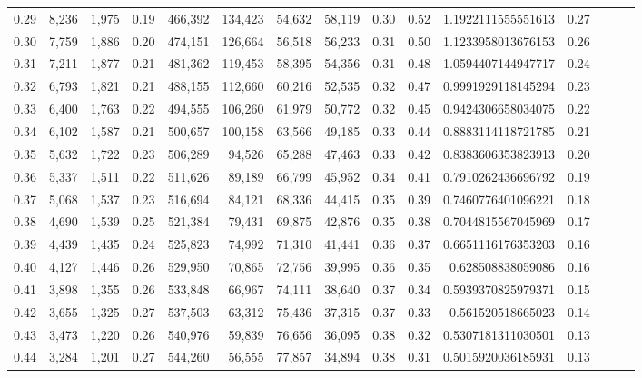 \begin{tabular}{rrrrrrrrrrrrrrr}
0.29 &   8,236 &  1,975 &  0.19 &  466,392 &  134,423 &   54,632 &   58,119 &  0.30 &  0.52 &    1.1922111555551613 &      0.27 \\
0.30 &   7,759 &  1,886 &  0.20 &  474,151 &  126,664 &   56,518 &   56,233 &  0.31 &  0.50 &    1.1233958013676153 &      0.26 \\
0.31 &   7,211 &  1,877 &  0.21 &  481,362 &  119,453 &   58,395 &   54,356 &  0.31 &  0.48 &    1.0594407144947717 &      0.24 \\
0.32 &   6,793 &  1,821 &  0.21 &  488,155 &  112,660 &   60,216 &   52,535 &  0.32 &  0.47 &    0.9991929118145294 &      0.23 \\
0.33 &   6,400 &  1,763 &  0.22 &  494,555 &  106,260 &   61,979 &   50,772 &  0.32 &  0.45 &    0.9424306658034075 &      0.22 \\
0.34 &   6,102 &  1,587 &  0.21 &  500,657 &  100,158 &   63,566 &   49,185 &  0.33 &  0.44 &    0.8883114118721785 &      0.21 \\
0.35 &   5,632 &  1,722 &  0.23 &  506,289 &   94,526 &   65,288 &   47,463 &  0.33 &  0.42 &    0.8383606353823913 &      0.20 \\
0.36 &   5,337 &  1,511 &  0.22 &  511,626 &   89,189 &   66,799 &   45,952 &  0.34 &  0.41 &    0.7910262436696792 &      0.19 \\
0.37 &   5,068 &  1,537 &  0.23 &  516,694 &   84,121 &   68,336 &   44,415 &  0.35 &  0.39 &    0.7460776401096221 &      0.18 \\
0.38 &   4,690 &  1,539 &  0.25 &  521,384 &   79,431 &   69,875 &   42,876 &  0.35 &  0.38 &    0.7044815567045969 &      0.17 \\
0.39 &   4,439 &  1,435 &  0.24 &  525,823 &   74,992 &   71,310 &   41,441 &  0.36 &  0.37 &    0.6651116176353203 &      0.16 \\
0.40 &   4,127 &  1,446 &  0.26 &  529,950 &   70,865 &   72,756 &   39,995 &  0.36 &  0.35 &     0.628508838059086 &      0.16 \\
0.41 &   3,898 &  1,355 &  0.26 &  533,848 &   66,967 &   74,111 &   38,640 &  0.37 &  0.34 &    0.5939370825979371 &      0.15 \\
0.42 &   3,655 &  1,325 &  0.27 &  537,503 &   63,312 &   75,436 &   37,315 &  0.37 &  0.33 &     0.561520518665023 &      0.14 \\
0.43 &   3,473 &  1,220 &  0.26 &  540,976 &   59,839 &   76,656 &   36,095 &  0.38 &  0.32 &    0.5307181311030501 &      0.13 \\
0.44 &   3,284 &  1,201 &  0.27 &  544,260 &   56,555 &   77,857 &   34,894 &  0.38 &  0.31 &    0.5015920036185931 &      0.13 \\

\end{tabular}
